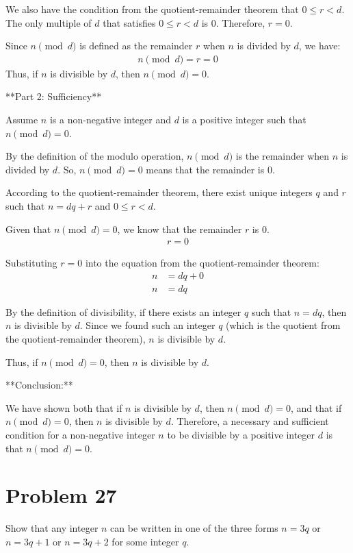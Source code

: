 \documentclass{article}
\begin{document}
We also have the condition from the quotient-remainder theorem that $0 \le r < d$.
The only multiple of $d$ that satisfies $0 \le r < d$ is $0$.
Therefore, $r = 0$.

Since $n \pmod{d}$ is defined as the remainder $r$ when $n$ is divided by $d$, we have:
\begin{align*} n \pmod{d} = r = 0 \end{align*}
Thus, if $n$ is divisible by $d$, then $n \pmod{d} = 0$.

**Part 2: Sufficiency**

Assume $n$ is a non-negative integer and $d$ is a positive integer such that $n \pmod{d} = 0$.

By the definition of the modulo operation, $n \pmod{d}$ is the remainder when $n$ is divided by $d$. So, $n \pmod{d} = 0$ means that the remainder is 0.

According to the quotient-remainder theorem, there exist unique integers $q$ and $r$ such that $n = dq + r$ and $0 \le r < d$.

Given that $n \pmod{d} = 0$, we know that the remainder $r$ is 0.
\begin{align*} r = 0 \end{align*}

Substituting $r = 0$ into the equation from the quotient-remainder theorem:
\begin{align*} n &= dq + 0 \\ n &= dq \end{align*}

By the definition of divisibility, if there exists an integer $q$ such that $n = dq$, then $n$ is divisible by $d$.
Since we found such an integer $q$ (which is the quotient from the quotient-remainder theorem), $n$ is divisible by $d$.

Thus, if $n \pmod{d} = 0$, then $n$ is divisible by $d$.

**Conclusion:**

We have shown both that if $n$ is divisible by $d$, then $n \pmod{d} = 0$, and that if $n \pmod{d} = 0$, then $n$ is divisible by $d$. Therefore, a necessary and sufficient condition for a non-negative integer $n$ to be divisible by a positive integer $d$ is that $n \pmod{d} = 0$.

\newpage

\section*{Problem 27}
Show that any integer $n$ can be written in one of the three forms $n = 3q$ or $n = 3q+1$ or $n = 3q+2$ for some integer $q$.
\end{document}
